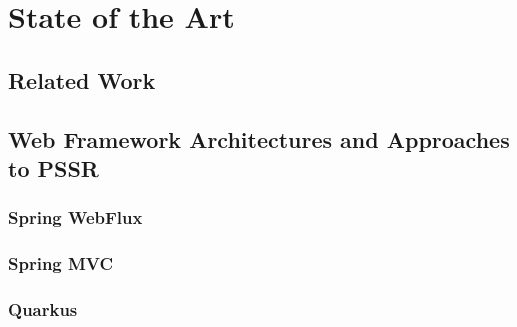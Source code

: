 \section{State of the Art}

\subsection{Related Work}

\subsection{Web Framework Architectures and Approaches to PSSR}

\subsubsection{Spring WebFlux}

\subsubsection{Spring MVC}

\subsubsection{Quarkus}